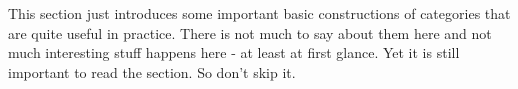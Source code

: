 This section just introduces some important basic constructions of categories that are quite useful in practice. There is not much to say about them here and not much interesting stuff happens here - at least at first glance. Yet it is still important to read the section. So don't skip it.

